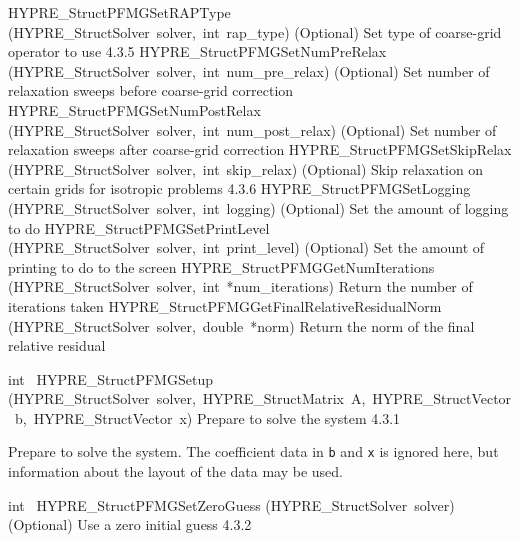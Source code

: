 \documentclass{article}
\begin{document}
\begin{cxxentry}
\begin{cxxentry}
\begin{cxxnames}
        {HYPRE\_StructPFMGSetRAPType}
        {(HYPRE\_StructSolver\ solver,\ int\ rap\_type)}
        {
(Optional) Set type of coarse-grid operator to use}
        {4.3.5}
        {HYPRE\_StructPFMGSetNumPreRelax}
        {(HYPRE\_StructSolver\ solver,\ int\ num\_pre\_relax)}
        {
(Optional) Set number of relaxation sweeps before coarse-grid correction}
        {}
\label{cxx.4.3.14}
        {HYPRE\_StructPFMGSetNumPostRelax}
        {(HYPRE\_StructSolver\ solver,\ int\ num\_post\_relax)}
        {
(Optional) Set number of relaxation sweeps after coarse-grid correction}
        {}
\label{cxx.4.3.15}
        {HYPRE\_StructPFMGSetSkipRelax}
        {(HYPRE\_StructSolver\ solver,\ int\ skip\_relax)}
        {
(Optional) Skip relaxation on certain grids for isotropic problems}
        {4.3.6}
        {HYPRE\_StructPFMGSetLogging}
        {(HYPRE\_StructSolver\ solver,\ int\ logging)}
        {
(Optional) Set the amount of logging to do}
        {}
\label{cxx.4.3.16}
        {HYPRE\_StructPFMGSetPrintLevel}
        {(HYPRE\_StructSolver\ solver,\ int\ print\_level)}
        {
(Optional) Set the amount of printing to do to the screen}
        {}
\label{cxx.4.3.17}
        {HYPRE\_StructPFMGGetNumIterations}
        {(HYPRE\_StructSolver\ solver,\ int\ *num\_iterations)}
        {
Return the number of iterations taken}
        {}
\label{cxx.4.3.18}
        {HYPRE\_StructPFMGGetFinalRelativeResidualNorm}
        {(HYPRE\_StructSolver\ solver,\ double\ *norm)}
        {
Return the norm of the final relative residual}
        {}
\label{cxx.4.3.19}
\end{cxxnames}
\begin{cxxfunction}
{int\ }
        {HYPRE\_StructPFMGSetup}
        {(HYPRE\_StructSolver\ solver,\ HYPRE\_StructMatrix\ A,\ HYPRE\_StructVector\ b,\ HYPRE\_StructVector\ x)}
        {
Prepare to solve the system}
        {4.3.1}
\begin{cxxdoc}

Prepare to solve the system.  The coefficient data in {\tt b} and {\tt x} is
ignored here, but information about the layout of the data may be used.
\end{cxxdoc}
\end{cxxfunction}
\begin{cxxfunction}
{int\ }
        {HYPRE\_StructPFMGSetZeroGuess}
        {(HYPRE\_StructSolver\ solver)}
        {
(Optional) Use a zero initial guess}
        {4.3.2}
\begin{cxxdoc}


\end{cxxdoc}
\end{cxxfunction}
\end{cxxentry}
\end{cxxentry}
\end{document}
